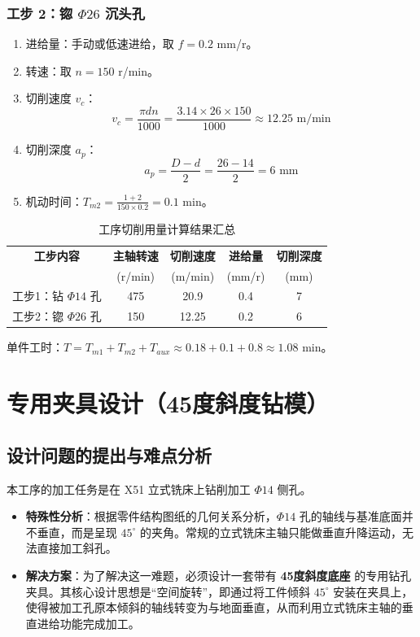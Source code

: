 \documentclass[withoutpreface,bwprint]{cumcmthesis}
\begin{document}
\subsubsection{工步 2：锪 $\Phi26$ 沉头孔}
\begin{enumerate}
    \item 进给量：手动或低速进给，取 $f = 0.2$ mm/r。
    \item 转速：取 $n = 150$ r/min。
    \item 切削速度 $v_c$：
    \[ v_c = \frac{\pi d n}{1000} = \frac{3.14 \times 26 \times 150}{1000} \approx 12.25 \text{ m/min} \]
    \item 切削深度 $a_p$：
    \[ a_p = \frac{D-d}{2} = \frac{26-14}{2} = 6 \text{ mm} \]
    \item 机动时间：$T_{m2} = \frac{1+2}{150 \times 0.2} = 0.1 \text{ min}$。
\end{enumerate}

\begin{table}[h]
    \centering
    \caption{工序切削用量计算结果汇总}
    \renewcommand\arraystretch{1.5}
    \begin{tabular}{|c|c|c|c|c|}
        \hline
        \textbf{工步内容} & \textbf{主轴转速} & \textbf{切削速度} & \textbf{进给量} & \textbf{切削深度} \\
         & (r/min) & (m/min) & (mm/r) & (mm) \\
        \hline
        工步1：钻 $\Phi14$ 孔 & 475 & 20.9 & 0.4 & 7 \\
        \hline
        工步2：锪 $\Phi26$ 孔 & 150 & 12.25 & 0.2 & 6 \\
        \hline
    \end{tabular}
\end{table}

单件工时：$T = T_{m1} + T_{m2} + T_{aux} \approx 0.18 + 0.1 + 0.8 \approx 1.08 \text{ min}$。

\section{专用夹具设计（45度斜度钻模）}

\subsection{设计问题的提出与难点分析}
本工序的加工任务是在 X51 立式铣床上钻削加工 $\Phi14$ 侧孔。
\begin{itemize}
    \item \textbf{特殊性分析}：根据零件结构图纸的几何关系分析，$\Phi14$ 孔的轴线与基准底面并不垂直，而是呈现 $45^\circ$ 的夹角。常规的立式铣床主轴只能做垂直升降运动，无法直接加工斜孔。
    \item \textbf{解决方案}：为了解决这一难题，必须设计一套带有 \textbf{45度斜度底座} 的专用钻孔夹具。其核心设计思想是“空间旋转”，即通过将工件倾斜 $45^\circ$ 安装在夹具上，使得被加工孔原本倾斜的轴线转变为与地面垂直，从而利用立式铣床主轴的垂直进给功能完成加工。
\end{itemize}
\end{document}
